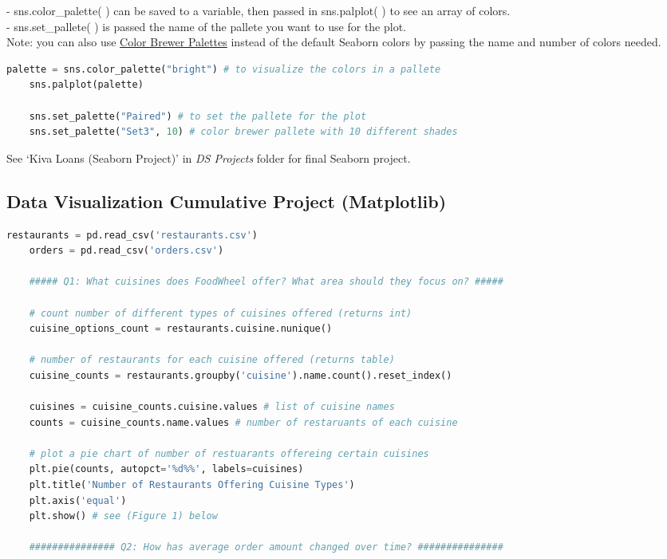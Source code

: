 \documentclass[11pt, a4paper]{article}
\begin{document}
\begin{spacing}{1.1}
	\hspace*{3mm} - sns.color\_palette( ) can be saved to a variable, then passed in sns.palplot( ) to see an array of colors. \\
	\hspace*{3mm} - sns.set\_pallete( ) is passed the name of the pallete you want to use for the plot. \vspace*{2mm} \\
	Note: you can also use \href{https://colorbrewer2.org/#type=sequential&scheme=BuGn&n=3}{Color Brewer Palettes} instead of the default Seaborn colors by passing the name and number of colors needed.
	\begin{lstlisting}[language=Python]
	palette = sns.color_palette("bright") # to visualize the colors in a pallete
	sns.palplot(palette) 
	
	sns.set_palette("Paired") # to set the pallete for the plot
	sns.set_palette("Set3", 10) # color brewer pallete with 10 different shades	\end{lstlisting} \vspace*{1mm}
	See `Kiva Loans (Seaborn Project)' in \textit{DS Projects} folder for final Seaborn project.\newpage
	\subsection{Data Visualization Cumulative Project (Matplotlib)}
	\begin{lstlisting}[language=Python]
	restaurants = pd.read_csv('restaurants.csv')
	orders = pd.read_csv('orders.csv')
	
	##### Q1: What cuisines does FoodWheel offer? What area should they focus on? #####
	
	# count number of different types of cuisines offered (returns int)
	cuisine_options_count = restaurants.cuisine.nunique()
	
	# number of restaurants for each cuisine offered (returns table)
	cuisine_counts = restaurants.groupby('cuisine').name.count().reset_index()
	
	cuisines = cuisine_counts.cuisine.values # list of cuisine names
	counts = cuisine_counts.name.values # number of restaruants of each cuisine
	
	# plot a pie chart of number of restuarants offereing certain cuisines 
	plt.pie(counts, autopct='%d%%', labels=cuisines)
	plt.title('Number of Restaurants Offering Cuisine Types')
	plt.axis('equal')
	plt.show() # see (Figure 1) below
	
	############### Q2: How has average order amount changed over time? ###############
	

\end{lstlisting}
\end{spacing}
\end{document}
